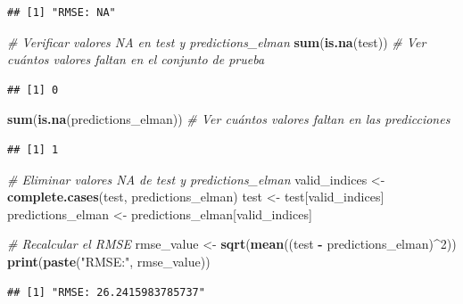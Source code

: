 \documentclass[
]{book}
\newenvironment{Shaded}{\begin{snugshade}}{\end{snugshade}}
\newcommand{\CommentTok}[1]{\textcolor[rgb]{0.56,0.35,0.01}{\textit{#1}}}
\newcommand{\DecValTok}[1]{\textcolor[rgb]{0.00,0.00,0.81}{#1}}
\newcommand{\FunctionTok}[1]{\textcolor[rgb]{0.13,0.29,0.53}{\textbf{#1}}}
\newcommand{\NormalTok}[1]{#1}
\newcommand{\OtherTok}[1]{\textcolor[rgb]{0.56,0.35,0.01}{#1}}
\newcommand{\SpecialCharTok}[1]{\textcolor[rgb]{0.81,0.36,0.00}{\textbf{#1}}}
\newcommand{\StringTok}[1]{\textcolor[rgb]{0.31,0.60,0.02}{#1}}
\begin{document}
\begin{verbatim}
## [1] "RMSE: NA"
\end{verbatim}

\begin{Shaded}
\begin{Highlighting}[]
\CommentTok{\# Verificar valores NA en \textquotesingle{}test\textquotesingle{} y \textquotesingle{}predictions\_elman\textquotesingle{}}
\FunctionTok{sum}\NormalTok{(}\FunctionTok{is.na}\NormalTok{(test))  }\CommentTok{\# Ver cuántos valores faltan en el conjunto de prueba}
\end{Highlighting}
\end{Shaded}

\begin{verbatim}
## [1] 0
\end{verbatim}

\begin{Shaded}
\begin{Highlighting}[]
\FunctionTok{sum}\NormalTok{(}\FunctionTok{is.na}\NormalTok{(predictions\_elman))  }\CommentTok{\# Ver cuántos valores faltan en las predicciones}
\end{Highlighting}
\end{Shaded}

\begin{verbatim}
## [1] 1
\end{verbatim}

\begin{Shaded}
\begin{Highlighting}[]
\CommentTok{\# Eliminar valores NA de \textquotesingle{}test\textquotesingle{} y \textquotesingle{}predictions\_elman\textquotesingle{}}
\NormalTok{valid\_indices }\OtherTok{\textless{}{-}} \FunctionTok{complete.cases}\NormalTok{(test, predictions\_elman)}
\NormalTok{test }\OtherTok{\textless{}{-}}\NormalTok{ test[valid\_indices]}
\NormalTok{predictions\_elman }\OtherTok{\textless{}{-}}\NormalTok{ predictions\_elman[valid\_indices]}

\CommentTok{\# Recalcular el RMSE}
\NormalTok{rmse\_value }\OtherTok{\textless{}{-}} \FunctionTok{sqrt}\NormalTok{(}\FunctionTok{mean}\NormalTok{((test }\SpecialCharTok{{-}}\NormalTok{ predictions\_elman)}\SpecialCharTok{\^{}}\DecValTok{2}\NormalTok{))}
\FunctionTok{print}\NormalTok{(}\FunctionTok{paste}\NormalTok{(}\StringTok{"RMSE:"}\NormalTok{, rmse\_value))}
\end{Highlighting}
\end{Shaded}

\begin{verbatim}
## [1] "RMSE: 26.2415983785737"
\end{verbatim}
\end{document}

